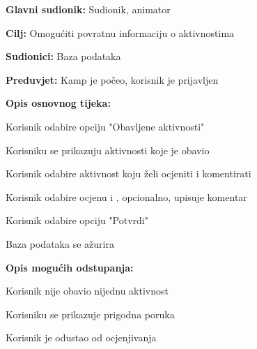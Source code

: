 					\noindent {}
					\begin{packed_item}
						
						\item \textbf{Glavni sudionik: }Sudionik, animator
						\item  \textbf{Cilj:} Omogućiti povratnu informaciju o aktivnostima
						\item  \textbf{Sudionici:} Baza podataka
						\item  \textbf{Preduvjet:} Kamp je počeo, korisnik je prijavljen
						\item  \textbf{Opis osnovnog tijeka:}
						
						\item[] \begin{packed_enum}
							
							\item Korisnik odabire opciju "Obavljene aktivnosti"
							\item Korisniku se prikazuju aktivnosti koje je obavio
							\item Korisnik odabire aktivnost koju želi ocjeniti i komentirati
							\item Korisnik odabire ocjenu i , opcionalno, upisuje komentar
							\item Korisnik odabire opciju "Potvrdi"
							\item Baza podataka se ažurira
						\end{packed_enum}
						
						\item  \textbf{Opis mogućih odstupanja:}
						
						\item[] \begin{packed_item}
							
							\item[2.a] Korisnik nije obavio nijednu aktivnost
							\item[] \begin{packed_enum}
								
								\item Korisniku se prikazuje prigodna poruka
								
							\end{packed_enum}
							\item[4.a] Korisnik je odustao od ocjenjivanja
							\item[] \begin{packed_enum}
								

\end{packed_enum}
\end{packed_item}
\end{packed_item}
